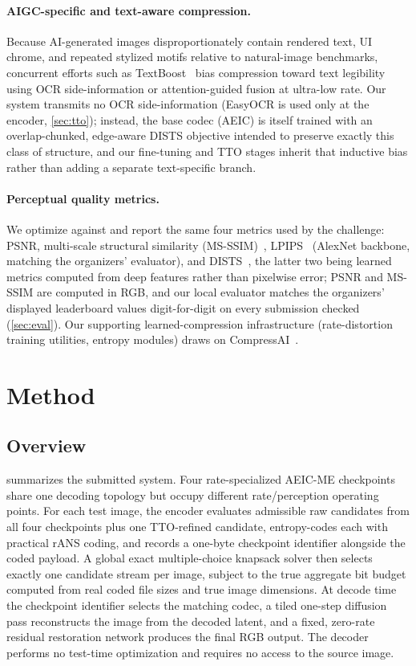 \documentclass[runningheads]{llncs}
\begin{document}
\paragraph{AIGC-specific and text-aware compression.} Because AI-generated images disproportionately contain rendered text, UI chrome, and repeated stylized motifs relative to natural-image benchmarks, concurrent efforts such as TextBoost~\cite{wang2026textboost} bias compression toward text legibility using OCR side-information or attention-guided fusion at ultra-low rate. Our system transmits no OCR side-information (EasyOCR is used only at the encoder, \cref{sec:tto}); instead, the base codec (AEIC) is itself trained with an overlap-chunked, edge-aware DISTS objective intended to preserve exactly this class of structure, and our fine-tuning and TTO stages inherit that inductive bias rather than adding a separate text-specific branch.

\paragraph{Perceptual quality metrics.} We optimize against and report the same four metrics used by the challenge: PSNR, multi-scale structural similarity (MS-SSIM)~\cite{wang2003msssim}, LPIPS~\cite{zhang2018lpips} (AlexNet backbone, matching the organizers' evaluator), and DISTS~\cite{ding2020dists}, the latter two being learned metrics computed from deep features rather than pixelwise error; PSNR and MS-SSIM are computed in RGB, and our local evaluator matches the organizers' displayed leaderboard values digit-for-digit on every submission checked (\cref{sec:eval}). Our supporting learned-compression infrastructure (rate-distortion training utilities, entropy modules) draws on CompressAI~\cite{begaint2020compressai}.

\section{Method}
\subsection{Overview}
 summarizes the submitted system. Four rate-specialized AEIC-ME checkpoints share one decoding topology but occupy different rate/perception operating points. For each test image, the encoder evaluates admissible raw candidates from all four checkpoints plus one TTO-refined candidate, entropy-codes each with practical rANS coding, and records a one-byte checkpoint identifier alongside the coded payload. A global exact multiple-choice knapsack solver then selects exactly one candidate stream per image, subject to the true aggregate bit budget computed from real coded file sizes and true image dimensions. At decode time the checkpoint identifier selects the matching codec, a tiled one-step diffusion pass reconstructs the image from the decoded latent, and a fixed, zero-rate residual restoration network produces the final RGB output. The decoder performs no test-time optimization and requires no access to the source image.
\end{document}
